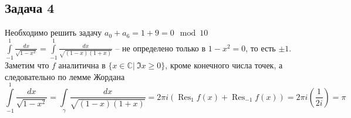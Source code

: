 \vskip 0.4in

\subsection*{Задача 4}
	Необходимо решить задачу $a_0 + a_6 = 1 + 9 = 0 \mod 10$\\
	$\int\limits_{-1}^{1} \frac{dx}{\sqrt{1-x^2}} = \int\limits_{-1}^{1} \frac{dx}{\sqrt{(1-x)(1+x)}}$ -- не определено только в $1-x^2 = 0$, то есть $\pm 1$. Заметим что $f$ аналитична в $\{x \in \mathbb{C}|\ \Im{x} \geqslant 0\}$, кроме конечного числа точек, а следовательно по лемме Жордана
	\begin{equation*}
		\int\limits_{-1}^{1} \frac{dx}{\sqrt{1-x^2}}
		= \int\limits_{\gamma} \frac{dx}{\sqrt{(1-x)(1+x)}}
		= 2 \pi i (\operatorname{Res}_{1} f(x) + \operatorname{Res}_{-1} f(x))
		= 2 \pi i (\frac{1}{2i})
		= \pi
	\end{equation*}